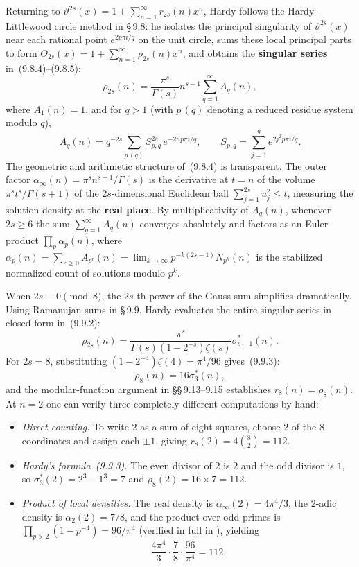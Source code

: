 Returning to $\vartheta^{2s}(x)=1+\sum_{n=1}^{\infty}r_{2s}(n)x^n$, Hardy follows the Hardy--Littlewood circle method in \S\,9.8: he isolates the principal singularity of $\vartheta^{2s}(x)$ near each rational point $e^{2p\pi i/q}$ on the unit circle, sums these local principal parts to form $\Theta_{2s}(x)=1+\sum_{n=1}^{\infty}\rho_{2s}(n)x^n$, and obtains the \textbf{singular series} in~(9.8.4)--(9.8.5):
\begin{equation*}\tag{9.8.4}
\rho_{2s}(n)=\frac{\pi^s}{\Gamma(s)}n^{s-1}\sum_{q=1}^{\infty}A_q(n),
\end{equation*}
where $A_1(n)=1$, and for $q>1$ (with $p\,(q)$ denoting a reduced residue system modulo $q$),
\begin{equation*}\tag{9.8.2,\,9.8.5}
A_q(n)=q^{-2s}\sum_{p\,(q)}S_{p,q}^{2s}\,e^{-2np\pi i/q},
\qquad
S_{p,q}=\sum_{j=1}^{q}e^{2j^2p\pi i/q}.
\end{equation*}
The geometric and arithmetic structure of~(9.8.4) is transparent. The outer factor $\alpha_\infty(n)=\pi^s n^{s-1}/\Gamma(s)$ is the derivative at $t=n$ of the volume $\pi^s t^s/\Gamma(s+1)$ of the $2s$-dimensional Euclidean ball $\sum_{j=1}^{2s}u_j^2\le t$, measuring the solution density at the \textbf{real place}. By multiplicativity of $A_q(n)$, whenever $2s\ge 6$ the sum $\sum_{q=1}^{\infty}A_q(n)$ converges absolutely and factors as an Euler product $\prod_p\alpha_p(n)$, where $\alpha_p(n)=\sum_{r\ge 0}A_{p^r}(n)=\lim_{k\to\infty}p^{-k(2s-1)}N_{p^k}(n)$ is the stabilized normalized count of solutions modulo $p^k$.

When $2s\equiv 0\pmod 8$, the $2s$-th power of the Gauss sum simplifies dramatically. Using Ramanujan sums in \S\,9.9, Hardy evaluates the entire singular series in closed form in~(9.9.2):
\begin{equation*}\tag{9.9.2}
\rho_{2s}(n)=\frac{\pi^s}{\Gamma(s)(1-2^{-s})\zeta(s)}\sigma_{s-1}^*(n).
\end{equation*}
For $2s=8$, substituting $(1-2^{-4})\zeta(4)=\pi^4/96$ gives~(9.9.3):
\begin{equation*}\tag{9.9.3}
\rho_8(n)=16\sigma_3^*(n),
\end{equation*}
and the modular-function argument in \S\S\,9.13--9.15 establishes $r_8(n)=\rho_8(n)$. At $n=2$ one can verify three completely different computations by hand:
\begin{itemize}
\item \emph{Direct counting.} To write $2$ as a sum of eight squares, choose $2$ of the $8$ coordinates and assign each $\pm 1$, giving $r_8(2)=4\binom{8}{2}=112$.
\item \emph{Hardy's formula~(9.9.3).} The even divisor of $2$ is $2$ and the odd divisor is $1$, so $\sigma_3^*(2)=2^3-1^3=7$ and $\rho_8(2)=16\times 7=112$.
\item \emph{Product of local densities.} The real density is $\alpha_\infty(2)=4\pi^4/3$, the $2$-adic density is $\alpha_2(2)=7/8$, and the product over odd primes is $\prod_{p>2}(1-p^{-4})=96/\pi^4$ (verified in full in ), yielding
\[
\frac{4\pi^4}{3}\cdot\frac{7}{8}\cdot\frac{96}{\pi^4}=112.
\]
\end{itemize}

